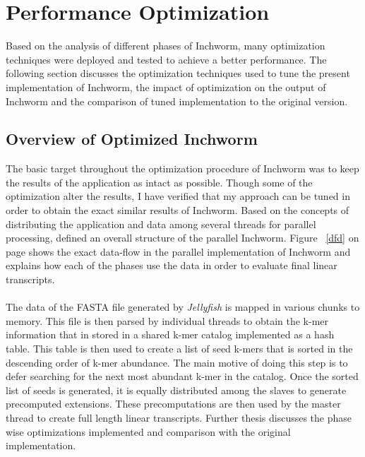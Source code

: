 \label{key}\documentclass[plainarticle, english ,zihtitle,final,hyperref,utf8]{zihpub}
\begin{document}
\section{Performance Optimization}
Based on the analysis of different phases of Inchworm, many optimization techniques were deployed and tested to achieve a better performance. The following section discusses the optimization techniques used to tune the present implementation of Inchworm, the impact of optimization on the output of Inchworm and the comparison of tuned implementation to the original version. 
\subsection{Overview of Optimized Inchworm}
The basic target throughout the optimization procedure of Inchworm was to keep the results of the application as intact as possible. Though some of the optimization alter the results, I have verified that my approach can be tuned in order to obtain the exact similar results of Inchworm. Based on the concepts of distributing the application and data among several threads for parallel processing, defined an overall structure of the parallel Inchworm. Figure ~\ref{dfd} on page \pageref{dfd} shows the exact data-flow in the parallel implementation of Inchworm and explains how each of the phases use the data in order to evaluate final linear transcripts. 
\paragraph{}
The data of the FASTA file generated by \emph{Jellyfish} is mapped in various chunks to memory. This file is then parsed by individual threads to obtain the k-mer information that in stored in a shared k-mer catalog implemented as a hash table. This table is then used to create a list of seed k-mers that is sorted in the descending order of k-mer abundance. The main motive of doing this step is to defer searching for the next most abundant k-mer in the catalog. Once the sorted list of seeds is generated, it is equally distributed among the slaves to generate precomputed extensions. These precomputations are then used by the master thread to create full length linear transcripts. Further thesis discusses the phase wise optimizations implemented and comparison with the original implementation.
\end{document}
